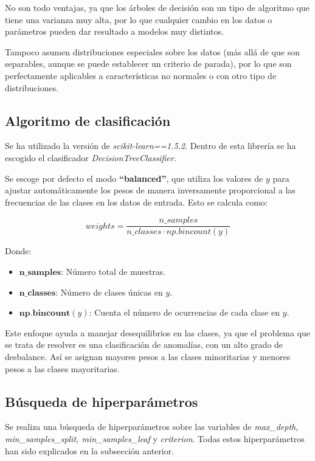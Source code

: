 \documentclass[12pt,letterpaper]{article}
\begin{document}
No son todo ventajas, ya que los árboles de decisión son un tipo de algoritmo que tiene una varianza muy alta, por lo que cualquier cambio en los datos o parámetros pueden dar resultado a modelos muy distintos.

Tampoco asumen distribuciones especiales sobre los datos (más allá de que son separables, aunque se puede establecer un criterio de parada), por lo que son perfectamente aplicables a características no normales o con otro tipo de distribuciones.

\subsection{Algoritmo de clasificación}
Se ha utilizado la versión de \textit{scikit-learn==1.5.2}. Dentro de esta librería se ha escogido el clasificador \textit{DecisionTreeClassifier}. 

Se escoge por defecto el modo \textbf{``balanced''}, que utiliza los valores de $y$ para ajustar automáticamente los pesos de manera inversamente proporcional a las frecuencias de las clases en los datos de entrada. Esto se calcula como:

\begin{equation}
    weights = \frac{n\_samples}{n\_classes \cdot np.bincount(y)}
\end{equation}

Donde:
\begin{itemize}
    \item \( \textbf{n\_samples} \): Número total de muestras.
    \item \( \textbf{n\_classes} \): Número de clases únicas en \( y \).
    \item \( \textbf{np.bincount}(y) \): Cuenta el número de ocurrencias de cada clase en \( y \).
\end{itemize}

Este enfoque ayuda a manejar desequilibrios en las clases, ya que el problema que se trata de resolver es una clasificación de anomalías, con un alto grado de desbalance. Así se asignan mayores pesos a las clases minoritarias y menores pesos a las clases mayoritarias.

\subsection{Búsqueda de hiperparámetros}
Se realiza una búsqueda de hiperparámetros sobre las variables de \textit{max\_depth, min\_samples\_split, min\_samples\_leaf} y \textit{criterion}. Todas estos hiperparámetros han sido explicados en la subsección anterior.
\end{document}
